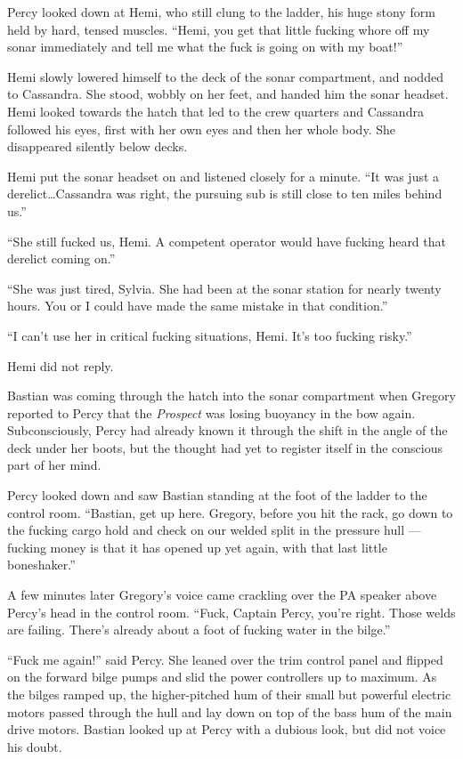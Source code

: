 \documentclass[
]{scrbook}
\begin{document}
Percy looked down at Hemi, who still clung to the ladder, his huge stony
form held by hard, tensed muscles. ``Hemi, you get that little fucking
whore off my sonar immediately and tell me what the fuck is going on
with my boat!''

Hemi slowly lowered himself to the deck of the sonar compartment, and
nodded to Cassandra. She stood, wobbly on her feet, and handed him the
sonar headset. Hemi looked towards the hatch that led to the crew
quarters and Cassandra followed his eyes, first with her own eyes and
then her whole body. She disappeared silently below decks.

Hemi put the sonar headset on and listened closely for a minute. ``It
was just a derelict\ldots Cassandra was right, the pursuing sub is still
close to ten miles behind us.''

``She still fucked us, Hemi. A competent operator would have fucking
heard that derelict coming on.''

``She was just tired, Sylvia. She had been at the sonar station for
nearly twenty hours. You or I could have made the same mistake in that
condition.''

``I can't use her in critical fucking situations, Hemi. It's too fucking
risky.''

Hemi did not reply.

Bastian was coming through the hatch into the sonar compartment when
Gregory reported to Percy that the \emph{Prospect} was losing buoyancy
in the bow again. Subconsciously, Percy had already known it through the
shift in the angle of the deck under her boots, but the thought had yet
to register itself in the conscious part of her mind.

Percy looked down and saw Bastian standing at the foot of the ladder to
the control room. ``Bastian, get up here. Gregory, before you hit the
rack, go down to the fucking cargo hold and check on our welded split in
the pressure hull --- fucking money is that it has opened up yet again,
with that last little boneshaker.''

A few minutes later Gregory's voice came crackling over the PA speaker
above Percy's head in the control room. ``Fuck, Captain Percy, you're
right. Those welds are failing. There's already about a foot of fucking
water in the bilge.''

``Fuck me again!'' said Percy. She leaned over the trim control panel
and flipped on the forward bilge pumps and slid the power controllers up
to maximum. As the bilges ramped up, the higher-pitched hum of their
small but powerful electric motors passed through the hull and lay down
on top of the bass hum of the main drive motors. Bastian looked up at
Percy with a dubious look, but did not voice his doubt.
\end{document}
